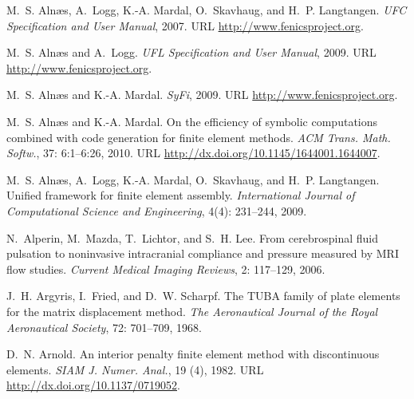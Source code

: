 \begin{thebibliography}{467}
M.~S. Aln\ae{}s, A.~Logg, K.-A. Mardal, O.~Skavhaug, and H.~P. Langtangen.
\newblock \emph{{UFC} Specification and User Manual}, 2007.
\newblock URL \url{http://www.fenicsproject.org}.

M.~S. Aln\ae{}s and A.~Logg.
\newblock \emph{{UFL} Specification and User Manual}, 2009.
\newblock URL \url{http://www.fenicsproject.org}.

M.~S. Aln{\ae}s and K.-A. Mardal.
\newblock \emph{{SyFi}}, 2009.
\newblock URL \url{http://www.fenicsproject.org}.

M.~S. Aln{\ae}s and K.-A. Mardal.
\newblock On the efficiency of symbolic computations combined with code
  generation for finite element methods.
\newblock \emph{ACM Trans. Math. Softw.}, 37: 6:1--6:26, 2010.
\newblock URL \url{http://dx.doi.org/10.1145/1644001.1644007}.

M.~S. Aln\ae{}s, A.~Logg, K.-A. Mardal, O.~Skavhaug, and H.~P. Langtangen.
\newblock Unified framework for finite element assembly.
\newblock \emph{International Journal of Computational Science and
  Engineering}, 4(4): 231--244, 2009.

N.~Alperin, M.~Mazda, T.~Lichtor, and S.~H. Lee.
\newblock From cerebrospinal fluid pulsation to noninvasive intracranial
  compliance and pressure measured by {MRI} flow studies.
\newblock \emph{Current Medical Imaging Reviews}, 2: 117--129, 2006.

J.~H. Argyris, I.~Fried, and D.~W. Scharpf.
\newblock The {TUBA} family of plate elements for the matrix displacement
  method.
\newblock \emph{The Aeronautical Journal of the Royal Aeronautical Society},
  72: 701--709, 1968.

D.~N. Arnold.
\newblock An interior penalty finite element method with discontinuous
  elements.
\newblock \emph{SIAM J. Numer. Anal.}, 19 (4), 1982.
\newblock URL \url{http://dx.doi.org/10.1137/0719052}.


\end{thebibliography}
